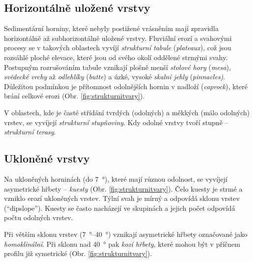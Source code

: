 \subsection{Horizontálně uložené vrstvy}
Sedimentární horniny, které nebyly postižené vrásněním mají zpravidla horizontálně až subhorizontálně uložené vrstvy. 
Fluviální erozí a svahovými procesy se v takových oblastech vyvíjí \emph{strukturní tabule} (\textit{plateaux}), což jsou rozsáhlé ploché elevace, které jsou od svého okolí oddělené strmými svahy. Postupným rozrušováním tabule vznikají plošně menší \emph{stolové hory} (\textit{mesa}), \emph{svědecké vrchy} až \emph{odlehlíky} (\textit{butte}) a úzké, vysoké \emph{skalní jehly} (\textit{pinnacles)}. Důležitou podmínkou je přítomnost odolnějších hornin v nadloží (\textit{caprock}), které brání celkové erozi (Obr. \ref{fig:strukturnitvary}).

V oblastech, kde je časté střídání tvrdých (odolných) a měkkých (málo odolných) vrstev, se vyvíjejí \emph{strukturní stupňoviny}. Kdy odolné vrstvy tvoří stupně -- \emph{strukturní terasy}.

\subsection{Ukloněné vrstvy}
Na ukloněných horninách (do \SI{7}{\degree}), které mají různou odolnost, se vyvíjejí asymetrické hřbety -- \emph{kuesty} (Obr. \ref{fig:strukturnitvary}). Čelo kuesty je strmé a vzniklo erozí ukloněných vrstev. Týlní svah je mírný a odpovídá sklonu vrstev (\enquote{dipslope}). Kuesty se často nacházejí ve skupinách a jejich počet odpovídá počtu odolných vrstev. 

Při větším sklonu vrstev (\SIrange{7}{40}{\degree}) vznikají asymetrické hřbety označované jako \emph{homoklinální}. Při sklonu nad \SI{40}{\degree} pak \emph{kozí hřbety}, které mohou být v příčnem profilu již symetrické (Obr. \ref{fig:strukturnitvary}).

